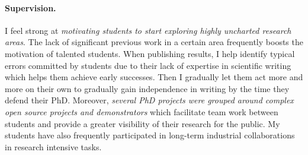 \documentclass[a4paper,11pt]{article}
\begin{document}
\paragraph{Supervision.} 
I feel strong at \emph{motivating students to start exploring highly uncharted research areas}. The lack of significant previous work in a certain area frequently boosts the motivation of talented students. When publishing results, I help identify typical errors committed by students due to their lack of expertise in scientific writing which helps them achieve early successes. Then I gradually let them act more and more on their own to gradually gain independence in writing by the time they defend their PhD. Moreover, \emph{several PhD projects were grouped around complex open source projects and demonstrators} which facilitate team work between students and provide a greater visibility of their research for the public. My students have also frequently participated in long-term industrial collaborations in research intensive tasks.


\end{document}
